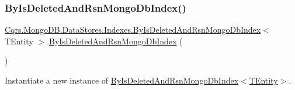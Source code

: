 \subsubsection{\texorpdfstring{By\+Is\+Deleted\+And\+Rsn\+Mongo\+Db\+Index()}{ByIsDeletedAndRsnMongoDbIndex()}}
{\footnotesize\ttfamily \hyperlink{classCqrs_1_1MongoDB_1_1DataStores_1_1Indexes_1_1ByIsDeletedAndRsnMongoDbIndex}{Cqrs.\+Mongo\+D\+B.\+Data\+Stores.\+Indexes.\+By\+Is\+Deleted\+And\+Rsn\+Mongo\+Db\+Index}$<$ T\+Entity $>$.\hyperlink{classCqrs_1_1MongoDB_1_1DataStores_1_1Indexes_1_1ByIsDeletedAndRsnMongoDbIndex}{By\+Is\+Deleted\+And\+Rsn\+Mongo\+Db\+Index} (\begin{DoxyParamCaption}{ }\end{DoxyParamCaption})\hspace{0.3cm}{\ttfamily [protected]}}



Instantiate a new instance of \hyperlink{classCqrs_1_1MongoDB_1_1DataStores_1_1Indexes_1_1ByIsDeletedAndRsnMongoDbIndex_ab558793f6a92b0a32bb6432268271a28_ab558793f6a92b0a32bb6432268271a28}{By\+Is\+Deleted\+And\+Rsn\+Mongo\+Db\+Index$<$\+T\+Entity$>$}. 


